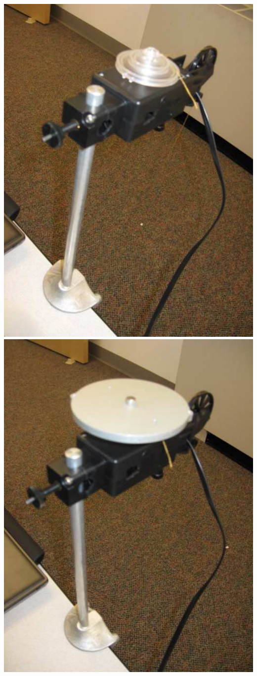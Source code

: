 \documentclass[11pt]{article}
\begin{document}
\begin{enumerate}
\begin{center}
\includegraphics[height=0.30\textheight]{rot1.pdf}
\includegraphics[height=0.30\textheight]{rot2.pdf}

\end{center}
\end{enumerate}
\end{document}
